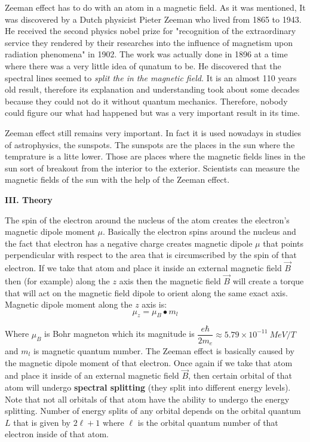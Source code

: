 \documentclass[fleqn]{article}
\begin{document}
  Zeeman effect has to do with an atom in a magnetic field. As it was mentioned, It was discovered by a Dutch physicist Pieter Zeeman who lived
  from 1865 to 1943. He received the second physics nobel prize for "recognition of the extraordinary service they rendered by their researches into 
  the influence of magnetism upon radiation phenomena" in 1902. \textcite{Two} The work was actually done in 1896 at a time where there was a 
  very little idea of qunatum to be. He discovered that the spectral lines seemed to \emph{split the in the magnetic field.} It is an almost 110 years 
  old result, therefore its explanation and understanding took about some decades because they could not do it without quantum mechanics. Therefore,
  nobody could figure our what had happened but was a very important result in its time.
  
  Zeeman effect still remains very important. In fact it is used nowadays in studies of astrophysics, the sunspots. The sunspots are the places 
  in the sun where the temprature is a litte lower. Those are places where the magnetic fields lines in the sun sort of breakout from the 
  interior to the exterior. Scientists can measure the magnetic fields of the sun with the help of the Zeeman effect. \textcite{Three}   

  \vspace{20px}

  \textbf{III. Theory}

  \vspace{10px}

  The spin of the electron around the nucleus of the atom creates the electron's magnetic dipole moment $\mu$. Basically the electron spins 
  around the nucleus and the fact that electron has a negative charge creates magnetic dipole $\mu$ that points perpendicular with respect to
  the area that is circumscribed by the spin of that electron. If we take that atom and place it inside an external magnetic field $\overrightarrow{B}$
  then (for example) along the $z$ axis then the magnetic field $\overrightarrow{B}$ will create a torque that will act on the magnetic field dipole to orient
  along the same exact axis. Magnetic dipole moment along the $z$ axis is:
  $$
    \mu_z=\mu_B \bullet m_l
  $$

  Where $\mu_B$ is Bohr magneton which its magnitude is $\dfrac{e \hbar}{2 m_e} \approx 5.79 \times 10^{-11} ~ MeV/T$ \textcite{Four} and $m_l$ is magnetic quantum number. The Zeeman effect is basically caused by the magnetic dipole 
  moment of that electron. Once again if we take that atom and place it inside of an external magnetic field $\overrightarrow{B}$, then 
  certain orbital of that atom will undergo \textbf{spectral splitting} (they split into different energy levels). Note that not all
  orbitals of that atom have the ability to undergo the energy splitting. Number of energy splits of any orbital depends on the orbital quantum $L$ that is given by $2\ell+1$ where $\ell$ is the orbital quantum 
  number of that electron inside of that atom.
\end{document}
